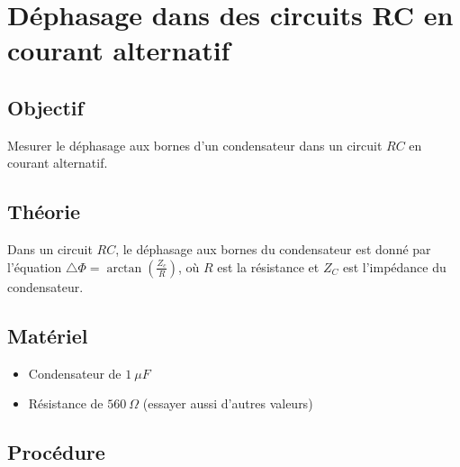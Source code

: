 \documentclass{book}
\begin{document}




\section{Déphasage dans des circuits RC en courant alternatif}



\subsection{Objectif}


Mesurer le déphasage aux bornes d'un condensateur dans un circuit $RC$ en courant alternatif.

\subsection{Théorie}


Dans un circuit $RC$, le déphasage aux bornes du condensateur est donné par l'équation $\triangle\Phi=\arctan\left(\frac{Z_{c} }{R}\right)$, où $R$ est la résistance et
$Z_{C}$  est l'impédance du condensateur.

\subsection{Matériel}


\begin{itemize}
  \item Condensateur de $1\ \mu F$
  \item Résistance de $560\ \Omega$  (essayer aussi d'autres valeurs)
\end{itemize}

\subsection{Procédure}
\end{document}
